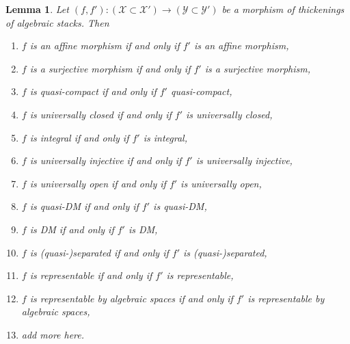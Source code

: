 \documentclass[10pt,a4paper]{amsart}
\theoremstyle{plain}
\newtheorem{lemma}[subsection]{Lemma}
\theoremstyle{definition}
\theoremstyle{remark}
\numberwithin{equation}{subsection}
\begin{document}
\begin{lemma}
\label{lemma-thicken-property-morphisms}
Let $(f, f') : (\mathcal{X} \subset \mathcal{X}') \to
(\mathcal{Y} \subset \mathcal{Y}')$
be a morphism of thickenings of algebraic stacks. Then
\begin{enumerate}
\item $f$ is an affine morphism if and only if $f'$ is an affine morphism,
\item $f$ is a surjective morphism if and only if $f'$ is a surjective morphism,
\item $f$ is quasi-compact if and only if $f'$ quasi-compact,
\item $f$ is universally closed if and only if $f'$ is universally closed,
\item $f$ is integral if and only if $f'$ is integral,
\item $f$ is universally injective if and only if $f'$ is universally injective,
\item $f$ is universally open if and only if $f'$ is universally open,
\item $f$ is quasi-DM if and only if $f'$ is quasi-DM,
\item $f$ is DM if and only if $f'$ is DM,
\item $f$ is (quasi-)separated if and only if $f'$ is (quasi-)separated,
\item $f$ is representable if and only if $f'$ is representable,
\item $f$ is representable by algebraic spaces if and only if $f'$ is
representable by algebraic spaces,
\item add more here.
\end{enumerate}
\end{lemma}
\end{document}
